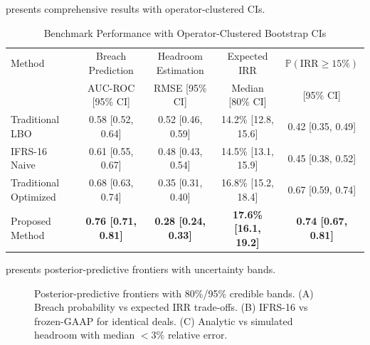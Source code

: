 \documentclass[11pt,a4paper]{article}
\newcommand{\Prob}{\mathbb{P}}
\numberwithin{equation}{section}
\theoremstyle{plain}
\theoremstyle{definition}
\begin{document}
 presents comprehensive results with operator-clustered CIs.

\begin{table}[h]
\centering
\caption{Benchmark Performance with Operator-Clustered Bootstrap CIs}
\begin{tabular}{lcccc}
\toprule
Method & Breach Prediction & Headroom Estimation & Expected IRR & $\Prob(\mathrm{IRR}\ge 15\%)$ \\
& AUC-ROC [95\% CI] & RMSE [95\% CI] & Median [80\% CI] & [95\% CI] \\
\midrule
Traditional LBO & 0.58 [0.52, 0.64] & 0.52 [0.46, 0.59] & 14.2\% [12.8, 15.6] & 0.42 [0.35, 0.49] \\
IFRS-16 Naive & 0.61 [0.55, 0.67] & 0.48 [0.43, 0.54] & 14.5\% [13.1, 15.9] & 0.45 [0.38, 0.52] \\
Traditional Optimized & 0.68 [0.63, 0.74] & 0.35 [0.31, 0.40] & 16.8\% [15.2, 18.4] & 0.67 [0.59, 0.74] \\
Proposed Method & \textbf{0.76 [0.71, 0.81]} & \textbf{0.28 [0.24, 0.33]} & \textbf{17.6\% [16.1, 19.2]} & \textbf{0.74 [0.67, 0.81]} \\
\bottomrule
\end{tabular}
\label{tab:benchmark_results}
\end{table}

 presents posterior-predictive frontiers with uncertainty bands.

\begin{figure}[h]
\centering
{}
\caption{Posterior-predictive frontiers with 80\%/95\% credible bands. (A) Breach probability vs expected IRR trade-offs. (B) IFRS-16 vs frozen-GAAP for identical deals. (C) Analytic vs simulated headroom with median $<3\%$ relative error.}
\label{fig:benchmark_performance}
\end{figure}
\end{document}

